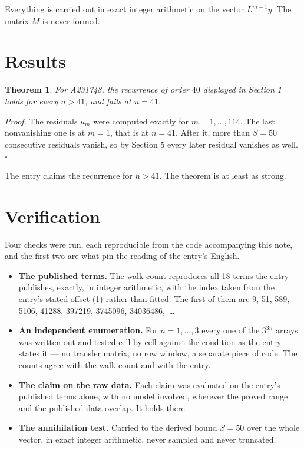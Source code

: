 \documentclass[11pt]{article}
\newtheorem{theorem}{Theorem}
\theoremstyle{definition}
\begin{document}
Everything is carried out in exact integer arithmetic on the vector $L^{m-1}y$. The matrix $M$ is never formed.

\section{Results}

\begin{theorem} For A231748, the recurrence of order $40$ displayed in Section 1 holds for every $n > 41$, and fails at $n = 41$.\end{theorem}

{\itshape Proof.} The residuals $u_m$ were computed exactly for $m = 1,\dots,114$. The last nonvanishing one is at $m = 1$, that is at $n = 41$. After it, more than $S = 50$ consecutive residuals vanish, so by Section 5 every later residual vanishes as well. $\square$

The entry claims the recurrence for $n > 41$. The theorem is at least as strong.

\section{Verification}

Four checks were run, each reproducible from the code accompanying this note, and the first two are what pin the reading of the entry's English.

\begin{itemize}

\item {\bfseries The published terms.} The walk count reproduces all 18 terms the entry publishes, exactly, in integer arithmetic, with the index taken from the entry's stated offset (1) rather than fitted. The first of them are 9, 51, 589, 5106, 41288, 397219, 3745096, 34036486,~\dots

\item {\bfseries An independent enumeration.} For $n = 1,\dots,3$ every one of the $3^{3n}$ arrays was written out and tested cell by cell against the condition as the entry states it --- no transfer matrix, no row window, a separate piece of code. The counts agree with the walk count and with the entry.

\item {\bfseries The claim on the raw data.} Each claim was evaluated on the entry's published terms alone, with no model involved, wherever the proved range and the published data overlap. It holds there.

\item {\bfseries The annihilation test.} Carried to the derived bound $S = 50$ over the whole vector, in exact integer arithmetic, never sampled and never truncated.

\end{itemize}
\end{document}
